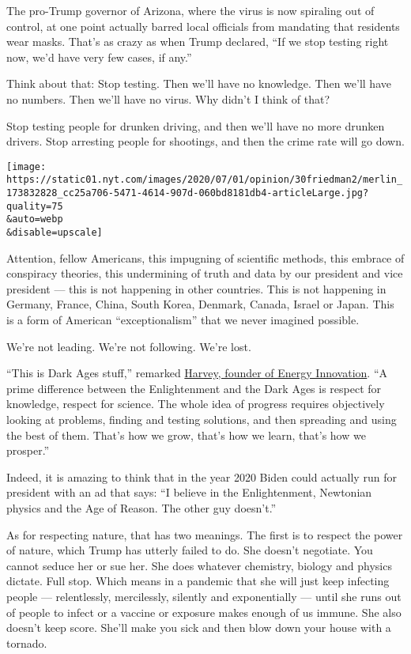 The pro-Trump governor of Arizona, where the virus is now spiraling out
of control, at one point actually barred local officials from mandating
that residents wear masks. That's as crazy as when Trump declared, ``If
we stop testing right now, we'd have very few cases, if any.''

Think about that: Stop testing. Then we'll have no knowledge. Then we'll
have no numbers. Then we'll have no virus. Why didn't I think of that?

Stop testing people for drunken driving, and then we'll have no more
drunken drivers. Stop arresting people for shootings, and then the crime
rate will go down.

\texttt{[image: https://static01.nyt.com/images/2020/07/01/opinion/30friedman2/merlin\_173832828\_cc25a706-5471-4614-907d-060bd8181db4-articleLarge.jpg?quality=75\\\&auto=webp\\\&disable=upscale]}

Attention, fellow Americans, this impugning of scientific methods, this
embrace of conspiracy theories, this undermining of truth and data by
our president and vice president --- this is not happening in other
countries. This is not happening in Germany, France, China, South Korea,
Denmark, Canada, Israel or Japan. This is a form of American
``exceptionalism'' that we never imagined possible.

We're not leading. We're not following. We're lost.

``This is Dark Ages stuff,'' remarked
\href{https://energyinnovation.org/team-member/hal-harvey/}{Harvey,
founder of Energy Innovation}. ``A prime difference between the
Enlightenment and the Dark Ages is respect for knowledge, respect for
science. The whole idea of progress requires objectively looking at
problems, finding and testing solutions, and then spreading and using
the best of them. That's how we grow, that's how we learn, that's how we
prosper.''

Indeed, it is amazing to think that in the year 2020 Biden could
actually run for president with an ad that says: ``I believe in the
Enlightenment, Newtonian physics and the Age of Reason. The other guy
doesn't.''

As for respecting nature, that has two meanings. The first is to respect
the power of nature, which Trump has utterly failed to do. She doesn't
negotiate. You cannot seduce her or sue her. She does whatever
chemistry, biology and physics dictate. Full stop. Which means in a
pandemic that she will just keep infecting people --- relentlessly,
mercilessly, silently and exponentially --- until she runs out of people
to infect or a vaccine or exposure makes enough of us immune. She also
doesn't keep score. She'll make you sick and then blow down your house
with a tornado.

